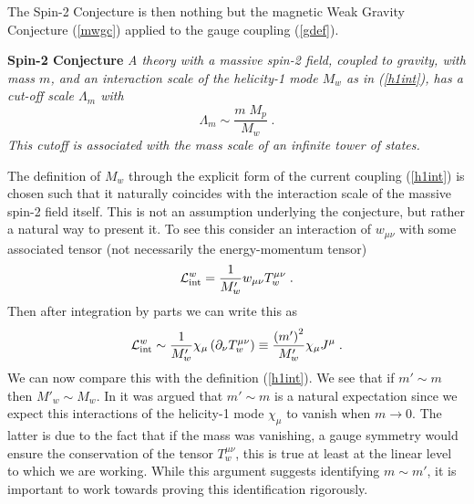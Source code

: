 \documentclass[11pt,a4paper]{article}
\numberwithin{equation}{section}
\numberwithin{table}{section}\setlength{\multlinegap}{25pt}
\newcommand{\be}{\begin{equation}}
\newcommand{\ee}{\end{equation}}
\begin{document}
{The Spin-2 Conjecture is then nothing but the magnetic Weak Gravity Conjecture (\ref{mwgc}) applied to the gauge coupling (\ref{gdef}).
\begin{tcolorbox}
{\bf Spin-2 Conjecture} \;\cite{Klaewer:2018yxi}
{\it 
\newline
\newline
A theory with a massive spin-2 field, coupled to gravity, with mass $m$, and an interaction scale of the helicity-1 mode $M_w$ as in (\ref{h1int}), has a cut-off scale $\Lambda_m$ with
\begin{equation}
\label{s2c}
\Lambda_{m} \sim \frac{m \;M_p}{M_w} \;.
\end{equation}
This cutoff is associated with the mass scale of an infinite tower of states.
}
\end{tcolorbox}

The definition of $M_w$ through the explicit form of the current coupling (\ref{h1int}) is chosen such that it naturally coincides with the interaction scale of the massive spin-2 field itself. This is not an assumption underlying the conjecture, but rather a natural way to present it. To see this consider an interaction of $w_{\mu\nu}$ with some associated tensor (not necessarily the energy-momentum tensor)
\be
{\cal L}^{w}_{\mathrm{int}} = \frac{1}{M'_w} w_{\mu\nu} T_w^{\mu\nu}\;.
\ee
Then after integration by parts we can write this as
\be
{\cal L}^{w}_{\mathrm{int}} \sim \frac{1}{M'_w} \chi_{\mu} \left( \partial_{\nu} T_w^{\mu\nu}\right) \equiv  \frac{\left(m'\right)^2}{M'_w} \chi_{\mu} J^{\mu} \;.
\label{curscal}
\ee
We can now compare this with the definition (\ref{h1int}). We see that if $m' \sim m$ then $M'_w \sim M_w$. In \cite{Klaewer:2018yxi} it was argued that $m' \sim m$ is a natural expectation since we expect this interactions of the helicity-1 mode $\chi_{\mu}$ to vanish when $m \rightarrow 0$. The latter is due to the fact that if the mass was vanishing, a gauge symmetry would ensure the conservation of the tensor $T_w^{\mu\nu}$, this is true at least at the linear level to which we are working. While this argument suggests identifying $m \sim m'$, it is important to work towards proving this identification rigorously.  

}
\end{document}
